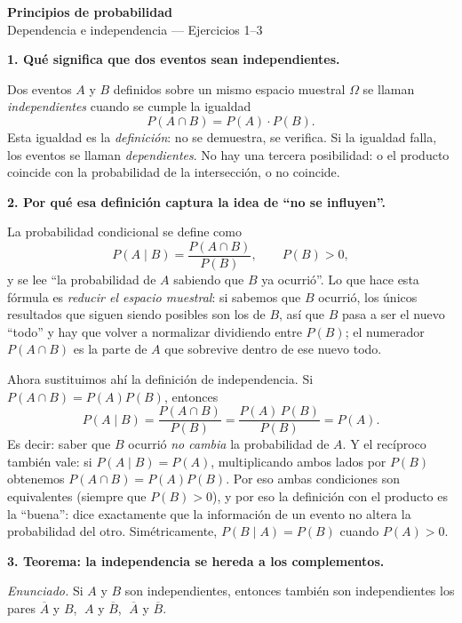\documentclass[11pt]{article}
\begin{document}
\begin{center}{\LARGE\bfseries Principios de probabilidad}\\[2pt]{\large Dependencia e independencia --- Ejercicios 1--3}\end{center}

\vspace{4pt}

\begin{teo}
\textbf{1. Qué significa que dos eventos sean independientes.}

Dos eventos $A$ y $B$ definidos sobre un mismo espacio muestral $\Omega$ se llaman
\emph{independientes} cuando se cumple la igualdad
\[
P(A\cap B)=P(A)\cdot P(B).
\]
Esta igualdad es la \emph{definición}: no se demuestra, se verifica. Si la igualdad falla,
los eventos se llaman \emph{dependientes}. No hay una tercera posibilidad: o el producto
coincide con la probabilidad de la intersección, o no coincide.

\medskip
\textbf{2. Por qué esa definición captura la idea de ``no se influyen''.}

La probabilidad condicional se define como
\[
P(A\mid B)=\frac{P(A\cap B)}{P(B)},\qquad P(B)>0,
\]
y se lee ``la probabilidad de $A$ sabiendo que $B$ ya ocurrió''. Lo que hace esta fórmula es
\emph{reducir el espacio muestral}: si sabemos que $B$ ocurrió, los únicos resultados que
siguen siendo posibles son los de $B$, así que $B$ pasa a ser el nuevo ``todo'' y hay que
volver a normalizar dividiendo entre $P(B)$; el numerador $P(A\cap B)$ es la parte de $A$
que sobrevive dentro de ese nuevo todo.

Ahora sustituimos ahí la definición de independencia. Si $P(A\cap B)=P(A)P(B)$, entonces
\[
P(A\mid B)=\frac{P(A\cap B)}{P(B)}=\frac{P(A)\,P(B)}{P(B)}=P(A).
\]
Es decir: saber que $B$ ocurrió \emph{no cambia} la probabilidad de $A$. Y el recíproco
también vale: si $P(A\mid B)=P(A)$, multiplicando ambos lados por $P(B)$ obtenemos
$P(A\cap B)=P(A)P(B)$. Por eso ambas condiciones son equivalentes (siempre que $P(B)>0$), y
por eso la definición con el producto es la ``buena'': dice exactamente que la información
de un evento no altera la probabilidad del otro. Simétricamente, $P(B\mid A)=P(B)$ cuando
$P(A)>0$.

\medskip
\textbf{3. Teorema: la independencia se hereda a los complementos.}

\emph{Enunciado.} Si $A$ y $B$ son independientes, entonces también son independientes los
pares $\overline{A}$ y $B$, $\;A$ y $\overline{B}$, $\;\overline{A}$ y $\overline{B}$.


\end{teo}
\end{document}
